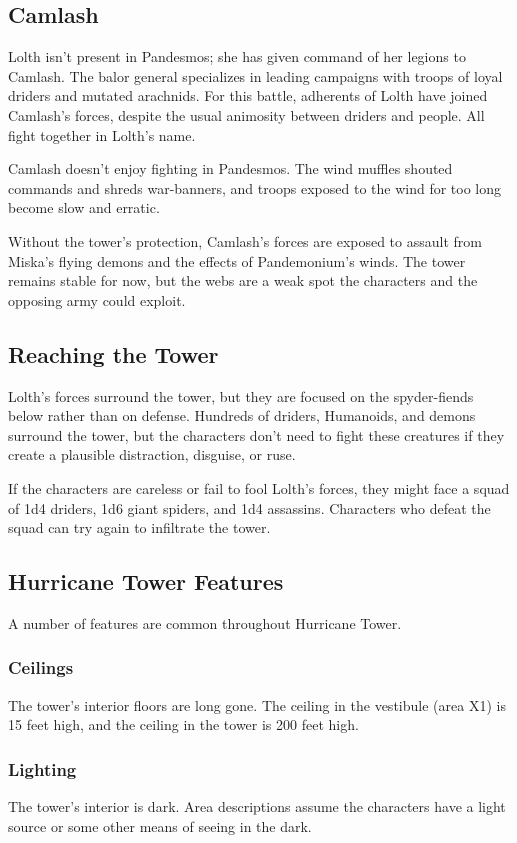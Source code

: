 \documentclass[10pt,a4paper,twoside,bg=print,twocolumn,openany,nodeprecatedcode]{dndbook}
\begin{document}
\subsection{Camlash}
Lolth isn't present in Pandesmos; she has given command of her legions to Camlash. The balor general specializes in leading campaigns with troops of loyal driders and mutated arachnids. For this battle, adherents of Lolth have joined Camlash's forces, despite the usual animosity between driders and people. All fight together in Lolth's name.

Camlash doesn't enjoy fighting in Pandesmos. The wind muffles shouted commands and shreds war-banners, and troops exposed to the wind for too long become slow and erratic.

Without the tower's protection, Camlash's forces are exposed to assault from Miska's flying demons and the effects of Pandemonium's winds. The tower remains stable for now, but the webs are a weak spot the characters and the opposing army could exploit.

\subsection{Reaching the Tower}
Lolth's forces surround the tower, but they are focused on the spyder-fiends below rather than on defense. Hundreds of driders, Humanoids, and demons surround the tower, but the characters don't need to fight these creatures if they create a plausible distraction, disguise, or ruse.

If the characters are careless or fail to fool Lolth's forces, they might face a squad of 1d4 driders, 1d6 giant spiders, and 1d4 assassins. Characters who defeat the squad can try again to infiltrate the tower.

\subsection{Hurricane Tower Features}
A number of features are common throughout Hurricane Tower.

\subsubsection{Ceilings}
The tower's interior floors are long gone. The ceiling in the vestibule (area X1) is 15 feet high, and the ceiling in the tower is 200 feet high.

\subsubsection{Lighting}
The tower's interior is dark. Area descriptions assume the characters have a light source or some other means of seeing in the dark.
\end{document}
